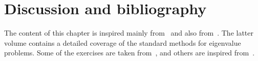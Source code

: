 \section{Discussion and bibliography}

The content of this chapter is inspired mainly from~\cite{VanDooren} and also from~\cite{MR3396212}.
The latter volume contains a detailed coverage of the standard methods for eigenvalue problems.
Some of the exercises are taken from~\cite{Vuik},
and others are inspired from~\cite{MR3396212}.

